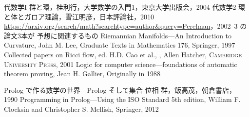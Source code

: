 \documentclass[11pt]{jsarticle}
\begin{document}
\begin{thebibliography}{100}
 代数学I 群と環，桂利行，大学数学の入門1，東京大学出版会，2004
 代数学2 環と体とガロア理論，雪江明彦，日本評論社，2010
 \url{https://arxiv.org/search/math?searchtype=author&query=Perelman}，2002--3 の論文3本が {\Poincare} 予想に関連するもの
 Riemannian Manifolds---An Introduction to Curvature, John M. Lee, Graduate Texts in Mathematics 176, Springer, 1997
 Collected papers on Ricci flow, ed. H.D. Cao et al.,
, Allen Hatcher, {\scshape Cambridge University Press}, 2001
  \bibitem[]{} Logic for computer science---foundations of automatic theorem proving, Jean H. Gallier, Originally in 1988

 Prolog で作る数学の世界---Prolog そして集合-位相-群，飯高茂，朝倉書店，1990
   Programming in Prolog---Using the ISO Standard 5th edition, William F. Clocksin and Christopher S. Mellish, Springer, 2012
\end{thebibliography}
\end{document}
